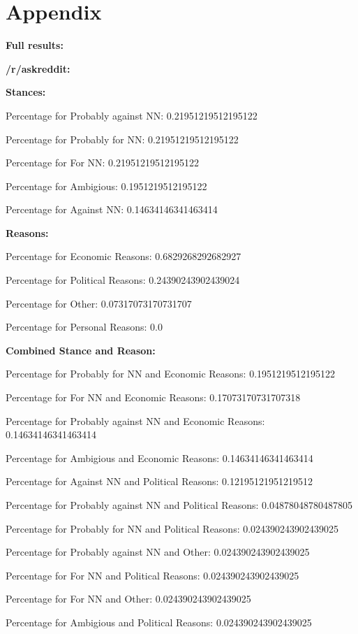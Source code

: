 \documentclass[11pt]{article}
\begin{document}
	
	
	\section{Appendix}\label{sec:appendix}
	\large{\textbf{Full results:}}
	
	\textbf{/r/askreddit:}
	
	\textbf{Stances:}
	
	Percentage for Probably against NN: 0.21951219512195122
	
	Percentage for Probably for NN: 0.21951219512195122
	
	Percentage for For NN: 0.21951219512195122
	
	Percentage for Ambigious: 0.1951219512195122
	
	Percentage for Against NN: 0.14634146341463414
	
	\textbf{Reasons:}
	
	Percentage for Economic Reasons: 0.6829268292682927
	
	Percentage for Political Reasons: 0.24390243902439024
	
	Percentage for Other: 0.07317073170731707
	
	Percentage for Personal Reasons: 0.0
	
	\textbf{Combined Stance and Reason:}
	
	Percentage for Probably for NN and Economic Reasons: 0.1951219512195122
	
	Percentage for For NN and Economic Reasons: 0.17073170731707318
	
	Percentage for Probably against NN and Economic Reasons: 0.14634146341463414
	
	Percentage for Ambigious and Economic Reasons: 0.14634146341463414
	
	Percentage for Against NN and Political Reasons: 0.12195121951219512
	
	Percentage for Probably against NN and Political Reasons: 0.04878048780487805
	
	Percentage for Probably for NN and Political Reasons: 0.024390243902439025
	
	Percentage for Probably against NN and Other: 0.024390243902439025
	
	Percentage for For NN and Political Reasons: 0.024390243902439025
	
	Percentage for For NN and Other: 0.024390243902439025
	
	Percentage for Ambigious and Political Reasons: 0.024390243902439025
	
\end{document}
